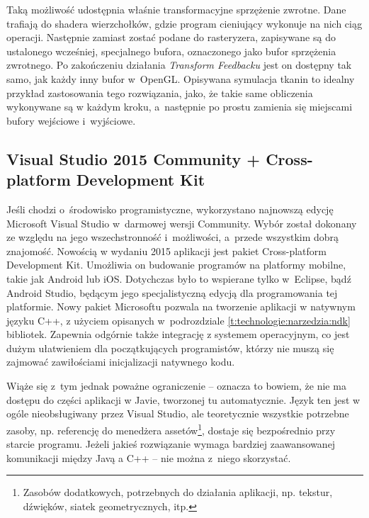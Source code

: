 			Taką możliwość udostępnia właśnie transformacyjne sprzężenie zwrotne. Dane trafiają do shadera wierzchołków, gdzie program cieniujący wykonuje na nich ciąg operacji. Następnie zamiast zostać podane do rasteryzera, zapisywane są do ustalonego wcześniej, specjalnego bufora, oznaczonego jako bufor sprzężenia zwrotnego. Po zakończeniu działania \emph{Transform Feedbacku} jest on dostępny tak samo, jak każdy inny bufor w~OpenGL. Opisywana symulacja tkanin to idealny przykład zastosowania tego rozwiązania, jako, że takie same obliczenia wykonywane są w każdym kroku, a~następnie po prostu zamienia się miejscami bufory wejściowe i~wyjściowe. 
		
		
		\subsection{Visual Studio 2015 Community + Cross-platform Development Kit}
		\label{t:technologie:narzedzia:vs}
		
		
		Jeśli chodzi o~środowisko programistyczne, wykorzystano najnowszą edycję Microsoft Visual Studio w~darmowej wersji Community. Wybór został dokonany ze względu na jego wszechstronność i~możliwości, a~przede wszystkim dobrą znajomość. Nowością w wydaniu 2015 aplikacji jest pakiet Cross-platform Development Kit. Umożliwia on budowanie programów na platformy mobilne, takie jak Android lub iOS. Dotychczas było to wspierane tylko w~Eclipse, bądź Android Studio, będącym jego specjalistyczną edycją dla programowania tej platformie. Nowy pakiet Microsoftu pozwala na tworzenie aplikacji w natywnym języku C++, z użyciem opisanych w~podrozdziale \ref{t:technologie:narzedzia:ndk} bibliotek. Zapewnia odgórnie także integrację z systemem operacyjnym, co jest dużym ułatwieniem dla początkujących programistów, którzy nie muszą się zajmować zawiłościami inicjalizacji natywnego kodu. 
		
		Wiąże się z~tym jednak poważne ograniczenie -- oznacza to bowiem, że nie ma dostępu do części aplikacji w Javie, tworzonej tu automatycznie. Język ten jest w ogóle nieobsługiwany przez Visual Studio, ale teoretycznie wszystkie potrzebne zasoby, np. referencję do menedżera assetów\footnote{Zasobów dodatkowych, potrzebnych do działania aplikacji, np. tekstur, dźwięków, siatek geometrycznych, itp.}, dostaje się bezpośrednio przy starcie programu. Jeżeli jakieś rozwiązanie wymaga bardziej zaawansowanej komunikacji między Javą a C++ -- nie można z~niego skorzystać.
		
